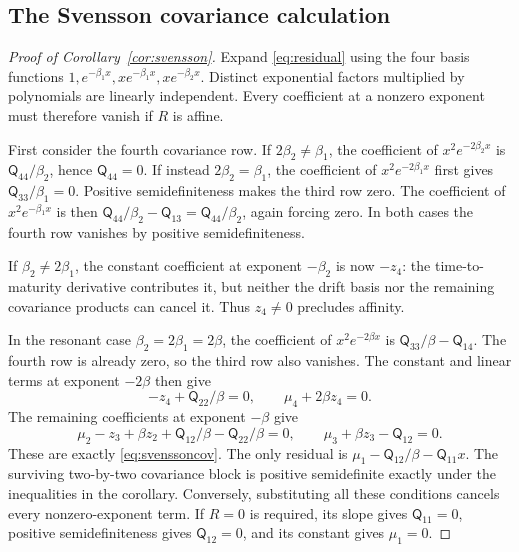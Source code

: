 \subsection{The Svensson covariance calculation}\label{app:svensson}
\begin{proof}[Proof of Corollary~\ref{cor:svensson}]
Expand \eqref{eq:residual} using the four basis functions
$1,e^{-\beta_1x},xe^{-\beta_1x},xe^{-\beta_2x}$.
Distinct exponential factors multiplied by polynomials are linearly independent. Every coefficient at a nonzero exponent must therefore vanish if $R$ is affine.

First consider the fourth covariance row. If $2\beta_2\ne\beta_1$, the coefficient of $x^2e^{-2\beta_2x}$ is $\mathsf Q_{44}/\beta_2$, hence $\mathsf Q_{44}=0$. If instead $2\beta_2=\beta_1$, the coefficient of $x^2e^{-2\beta_1x}$ first gives $\mathsf Q_{33}/\beta_1=0$. Positive semidefiniteness makes the third row zero. The coefficient of $x^2e^{-\beta_1x}$ is then $\mathsf Q_{44}/\beta_2-\mathsf Q_{13}=\mathsf Q_{44}/\beta_2$, again forcing zero. In both cases the fourth row vanishes by positive semidefiniteness.

If $\beta_2\ne2\beta_1$, the constant coefficient at exponent $-\beta_2$ is now $-z_4$: the time-to-maturity derivative contributes it, but neither the drift basis nor the remaining covariance products can cancel it. Thus $z_4\ne0$ precludes affinity.

In the resonant case $\beta_2=2\beta_1=2\beta$, the coefficient of $x^2e^{-2\beta x}$ is $\mathsf Q_{33}/\beta-\mathsf Q_{14}$. The fourth row is already zero, so the third row also vanishes. The constant and linear terms at exponent $-2\beta$ then give
\[
-z_4+\mathsf Q_{22}/\beta=0,\qquad \mu_4+2\beta z_4=0.
\]
The remaining coefficients at exponent $-\beta$ give
\[
\mu_2-z_3+\beta z_2+\mathsf Q_{12}/\beta-\mathsf Q_{22}/\beta=0,
\qquad \mu_3+\beta z_3-\mathsf Q_{12}=0.
\]
These are exactly \eqref{eq:svenssoncov}. The only residual is
$\mu_1-\mathsf Q_{12}/\beta-\mathsf Q_{11}x$.
The surviving two-by-two covariance block is positive semidefinite exactly under the inequalities in the corollary. Conversely, substituting all these conditions cancels every nonzero-exponent term. If $R=0$ is required, its slope gives $\mathsf Q_{11}=0$, positive semidefiniteness gives $\mathsf Q_{12}=0$, and its constant gives $\mu_1=0$.
\end{proof}
